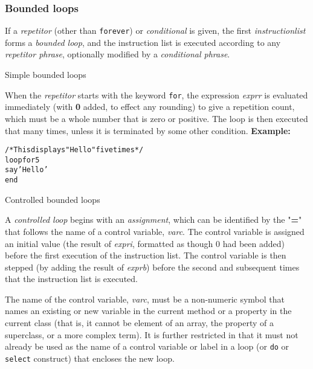 \subsubsection{Bounded loops}
 If a \emph{repetitor} (other than \texttt{forever}) or
\emph{conditional} is given, the first \emph{instructionlist}
forms a \emph{bounded loop}, and the instruction list is executed
according to any \emph{repetitor phrase}, optionally modified by a
\emph{conditional phrase}.
\begin{description}
\item{Simple bounded loops}

When the \emph{repetitor} starts with the keyword \texttt{for},
the expression \emph{exprr} is evaluated immediately
(with \textbf{0} added, to effect any rounding) to give a repetition
count, which must be a whole number that is zero or positive.
The loop is then executed that many times, unless it is terminated by
some other condition.
 \textbf{Example:}
\begin{alltt}
/* This displays "Hello" five times */
loop for 5
  say 'Hello'
  end
\end{alltt}
\item{Controlled bounded loops}

A \emph{controlled loop} begins with an \emph{assignment},
which can be identified by the "\textbf{=}" that follows the name
of a control variable, \emph{varc}.
The control variable is assigned an initial value (the result of
\emph{expri}, formatted as though 0 had been added)
before the first execution of the instruction list.
The control variable is then stepped (by adding the result of
\emph{exprb}) before the second and subsequent times that the
instruction list is executed.
 
The name of the control variable, \emph{varc}, must be a non-numeric
symbol that names an existing or new variable in the current method or a
property in the current class (that is, it cannot be element of an
array, the property of a superclass, or a more complex term).  It is
further restricted in that it must not already be used as the name of a
control variable or label in a loop (or \texttt{do} or \texttt{select}
construct) that encloses the new loop.
 

\end{description}

